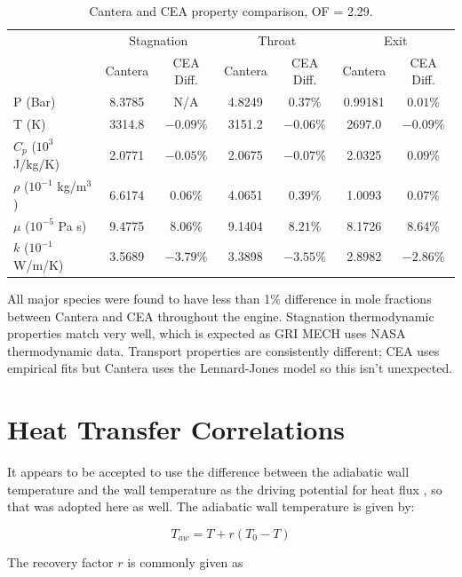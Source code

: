 \documentclass[11pt]{article}
\begin{document}
\begin{table}[H]
  \centering
  \caption{Cantera and CEA property comparison, OF = 2.29.}
  \begin{tabular}{l c c c c c c}
    \toprule
    & \multicolumn{2}{c}{Stagnation} & \multicolumn{2}{c}{Throat} & \multicolumn{2}{c}{Exit} \\
    \cmidrule(lr){2-3} \cmidrule(lr){4-5} \cmidrule(lr){6-7}
    & Cantera & CEA Diff. & Cantera & CEA Diff. & Cantera & CEA Diff. \\
    \midrule
    P (Bar) & 8.3785 & N/A & 4.8249 & $0.37\%$ & 0.99181 & $0.01\%$ \\
    T (K) & 3314.8 & $-0.09\%$ & 3151.2 & $-0.06\%$ & 2697.0 & $-0.09\%$ \\
    $C_p$ ($10^3$ J/kg/K) & 2.0771 & $-0.05\%$ & 2.0675 & $-0.07\%$ & 2.0325 & $0.09\%$ \\
    $\rho$ ($10^{-1}$ kg/m$^3$) & 6.6174 & $0.06\%$ & 4.0651 & $0.39\%$ & 1.0093 & $0.07\%$\\
    $\mu$ ($10^{-5}$ Pa s) & 9.4775 & $8.06\%$ & 9.1404 & $8.21\%$ & 8.1726 & $8.64\%$ \\
    $k$ ($10^{-1}$ W/m/K) & 3.5689 & $-3.79\%$ & 3.3898 & $-3.55\%$ & 2.8982 & $-2.86\%$\\
    \bottomrule
  \end{tabular}
\end{table}

All major species were found to have less than 1\% difference in mole fractions between Cantera and CEA throughout the engine. Stagnation thermodynamic properties match very well, which is expected as GRI MECH uses NASA thermodynamic data. Transport properties are consistently different; CEA uses empirical fits but Cantera uses the Lennard-Jones model so this isn't unexpected.

\section{Heat Transfer Correlations}

It appears to be accepted to use the difference between the adiabatic wall temperature and the wall temperature as the driving potential for heat flux \cite{}, so that was adopted here as well. The adiabatic wall temperature is given by:

\begin{equation}
    T_{aw} = T + r(T_0 - T)
\end{equation}

The recovery factor $r$ is commonly given as
\end{document}
